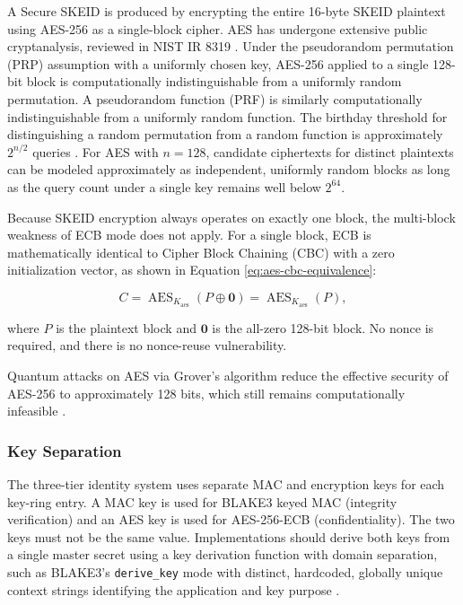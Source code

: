\documentclass[a4paper,fleqn]{cas-sc}
\begin{document}
A Secure SKEID is produced by encrypting the entire 16-byte SKEID
plaintext using AES-256 \citep{fips197} as a single-block cipher. AES
has undergone extensive public cryptanalysis, reviewed in NIST IR 8319
\citep{nistir8319}. Under the pseudorandom permutation (PRP) assumption
with a uniformly chosen key, AES-256 applied to a single 128-bit block
is computationally indistinguishable from a uniformly random
permutation. A pseudorandom function (PRF) is similarly computationally
indistinguishable from a uniformly random function. The birthday
threshold for distinguishing a random permutation from a random function
is approximately \(2^{n/2}\) queries \citep[Section 2.2]{bellare1998}.
For AES with \(n = 128\), candidate ciphertexts for distinct plaintexts
can be modeled approximately as independent, uniformly random blocks as
long as the query count under a single key remains well below
\(2^{64}\).

Because SKEID encryption always operates on exactly one block, the
multi-block weakness of ECB mode does not apply. For a single block, ECB
is mathematically identical to Cipher Block Chaining (CBC) with a zero
initialization vector, as shown in Equation
\eqref{eq:aes-cbc-equivalence}:

\begin{equation}
\label{eq:aes-cbc-equivalence}
C = \operatorname{AES}_{K_{\mathrm{aes}}}(P \oplus \mathbf{0})
  = \operatorname{AES}_{K_{\mathrm{aes}}}(P),
\end{equation}

where \(P\) is the plaintext block and \(\mathbf{0}\) is the all-zero
128-bit block. No nonce is required, and there is no nonce-reuse
vulnerability.

Quantum attacks on AES via Grover's algorithm reduce the effective
security of AES-256 to approximately 128 bits, which still remains
computationally infeasible \citep{bonnetain2019}.

\subsubsection{Key Separation}\label{key-separation}

The three-tier identity system uses separate MAC and encryption keys for
each key-ring entry. A MAC key is used for BLAKE3 keyed MAC (integrity
verification) and an AES key is used for AES-256-ECB (confidentiality).
The two keys must not be the same value. Implementations should derive
both keys from a single master secret using a key derivation function
with domain separation, such as BLAKE3's \texttt{derive\_key} mode with
distinct, hardcoded, globally unique context strings identifying the
application and key purpose \citep[Section 6.2]{blake3}.
\end{document}
